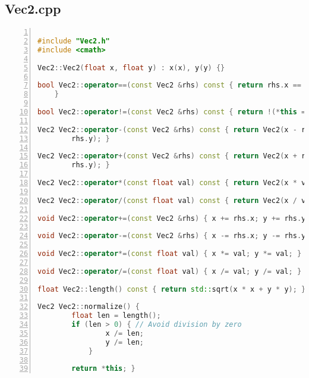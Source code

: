 \subsection*{Vec2.cpp}
\vspace{1em}
\begin{mdframed}[linecolor=black!30!white,linewidth=.5pt,extratopheight=1em]
    \begin{lstlisting}[language=C++, aboveskip=3mm,
    belowskip=3mm,
    showstringspaces=false,
    columns=flexible,
    basicstyle={\small\ttfamily},
    numbers=left,
    numberstyle=\tiny\color{gray},
    keywordstyle=\color{blue},
    commentstyle=\color{dkgreen},
    stringstyle=\color{mauve},
    breaklines=true,
    breakatwhitespace=true,
    tabsize=3,
    xleftmargin=1em]

#include "Vec2.h"
#include <cmath>

Vec2::Vec2(float x, float y) : x(x), y(y) {}

bool Vec2::operator==(const Vec2 &rhs) const { return rhs.x == x && rhs.y == y;
    }

bool Vec2::operator!=(const Vec2 &rhs) const { return !(*this == rhs); }

Vec2 Vec2::operator-(const Vec2 &rhs) const { return Vec2(x - rhs.x, y -
        rhs.y); }

Vec2 Vec2::operator+(const Vec2 &rhs) const { return Vec2(x + rhs.x, y +
        rhs.y); }

Vec2 Vec2::operator*(const float val) const { return Vec2(x * val, y * val); }

Vec2 Vec2::operator/(const float val) const { return Vec2(x / val, y / val); }

void Vec2::operator+=(const Vec2 &rhs) { x += rhs.x; y += rhs.y; }

void Vec2::operator-=(const Vec2 &rhs) { x -= rhs.x; y -= rhs.y; }

void Vec2::operator*=(const float val) { x *= val; y *= val; }

void Vec2::operator/=(const float val) { x /= val; y /= val; }

float Vec2::length() const { return std::sqrt(x * x + y * y); }

Vec2 Vec2::normalize() {
        float len = length();
        if (len > 0) { // Avoid division by zero
                x /= len;
                y /= len;
            }

        return *this; }

\end{lstlisting}
\end{mdframed}